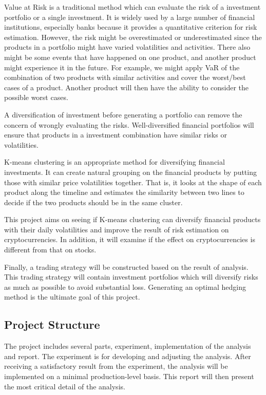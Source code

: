 \documentclass[11pt]{article} %
\theoremstyle{plain}
\theoremstyle{definition}
\begin{document}
Value at Risk is a traditional method which can evaluate the risk of a investment portfolio or a single investment. It is widely used by a large number of financial institutions, especially banks because it provides a quantitative criterion for risk estimation. However, the risk might be overestimated or underestimated since the products in a portfolio might have varied volatilities and activities. There also might be some events that have happened on one product, and another product might experience it in the future. For example, we might apply VaR of the combination of two products with similar activities and cover the worst/best cases of a product. Another product will then have the ability to consider the possible worst cases.

A diversification of investment before generating a portfolio can remove the concern of wrongly evaluating the risks. Well-diversified financial portfolios will ensure that products in a investment combination have similar risks or volatilities.

K-means clustering is an appropriate method for diversifying financial investments. It can create natural grouping on the financial products by putting those with similar price volatilities together. That is, it looks at the shape of each product along the timeline and estimates the similarity between two lines to decide if the two products should be in the same cluster.

This project aims on seeing if K-means clustering can diversify financial products with their daily volatilities and improve the result of risk estimation on cryptocurrencies. In addition, it will examine if the effect on cryptocurrencies is different from that on stocks.

Finally, a trading strategy will be constructed based on the result of analysis. This trading strategy will contain investment portfolios which will diversify risks as much as possible to avoid substantial loss. Generating an optimal hedging method is the ultimate goal of this project.

\subsection{Project Structure}

The project includes several parts, experiment, implementation of the analysis and report. The experiment is for developing and adjusting the analysis. After receiving a satisfactory result from the experiment, the analysis will be implemented on a minimal production-level basis. This report will then present the most critical detail of the analysis.
\end{document}
